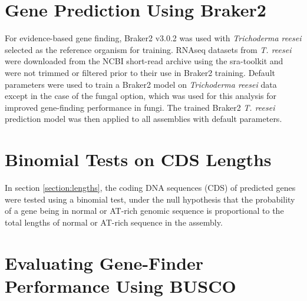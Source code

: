 \section{Gene Prediction Using Braker2}

For evidence-based gene finding, Braker2 v3.0.2\cite{Bruna2021} was
used with \textit{Trichoderma reesei} selected as the reference
organism for training. RNAseq datasets from \textit{T. reesei} were
downloaded from the NCBI short-read archive using the
sra-toolkit\cite{NCBI2025} and were not trimmed or filtered prior to
their use in Braker2 training. Default parameters were used to train a
Braker2 model on \textit{Trichoderma reesei} data except in the case
of the fungal option, which was used for this analysis for improved
gene-finding performance in fungi. The trained Braker2
\textit{T. reesei} prediction model was then applied to all assemblies
with default parameters.


\section{Binomial Tests on CDS Lengths}

In section \ref{section:lengths}, the coding DNA sequences (CDS) of
predicted genes were tested using a binomial test, under the null
hypothesis that the probability of a gene being in normal or AT-rich
genomic sequence is proportional to the total lengths of normal or
AT-rich sequence in the assembly.

\section{Evaluating Gene-Finder Performance Using BUSCO}

